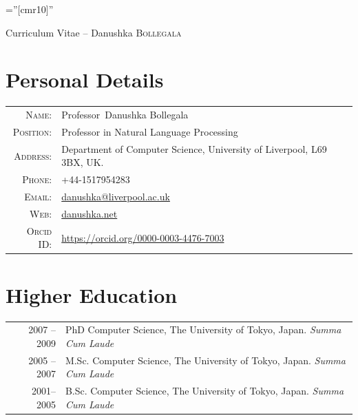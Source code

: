 \documentclass[a4paper,11pt]{article}
\begin{document}

\font\fb=''[cmr10]'' %

\par{\centering
		{\Large Curriculum Vitae -- Danushka \textsc{Bollegala}
	}\bigskip\par}

\section{Personal Details}

\begin{tabular}{rl}
    \textsc{Name:} & Professor~Danushka Bollegala\\
    \textsc{Position:} & Professor in Natural Language Processing\\
    \textsc{Address:}   & Department of Computer Science, University of Liverpool, L69 3BX, UK. \\
    \textsc{Phone:}     & +44-1517954283\\
    \textsc{Email:}     & \href{mailto:danushka@liverpool.ac.uk}{danushka@liverpool.ac.uk} \\
    \textsc{Web:} & \href{http://danushka.net}{danushka.net} \\
    \textsc{Orcid ID:} & \url{https://orcid.org/0000-0003-4476-7003}\\
\end{tabular}


\section{Higher Education}
\begin{tabular}{r|p{10cm}}
\textsc{2007 -- 2009} & PhD Computer Science, The University of Tokyo, Japan.  \emph{Summa Cum Laude} \\
\textsc{2005 -- 2007} & M.Sc. Computer Science, The University of Tokyo, Japan. \emph{Summa Cum Laude} \\
\textsc{2001-- 2005} & B.Sc. Computer Science, The University of Tokyo, Japan. \emph{Summa Cum Laude} \\
\end{tabular}
\end{document}
